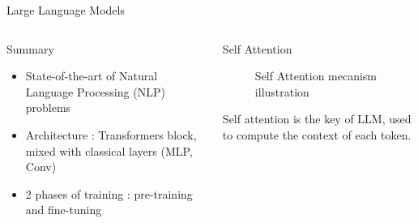 \begin{frame}{Large Language Models}
\begin{columns}
      
    \begin{column}[t]{0.4\textwidth}
    \begin{block}{Summary}
    
        \begin{itemize}
            \item State-of-the-art of Natural Language Processing (NLP) problems
            \item Architecture : Transformers\cite{NIPS2017_3f5ee243} block, mixed with classical layers (MLP, Conv)
            \item 2 phases of training : pre-training and fine-tuning
        \end{itemize}
            

    \end{block}
    \end{column}
        
    \begin{column}[t]{0.55\textwidth}
    \begin{block}{Self Attention }

        \begin{figure}
            \centering
            
            \caption{Self Attention mecanism illustration}
        \end{figure}
    
        Self attention is the key of LLM, used to compute the context of each token.
    \end{block}  
    \end{column}
         
\end{columns}
\end{frame}


